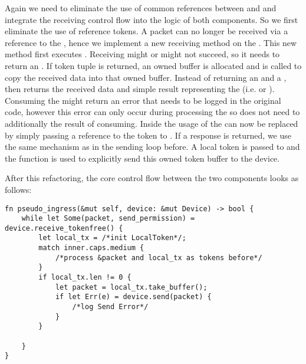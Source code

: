 Again we need to eliminate the use of common references between \stack{} and \dev{} and integrate the receiving control flow into the  logic of both components. So we first eliminate the use of reference tokens. A packet can no longer be received via a reference to the \dev{}, hence we implement a new receiving method on the \dev{}. This new method  first executes . Receiving might or might not succeed, so it needs to return an . If token tuple is returned, an owned buffer is allocated and  is called to copy the received data into that owned buffer. Instead of returning an  and a ,  then returns the received data and simple result representing the  (i.e.  or ). Consuming the  might return an error that needs to be logged in the original code, however this error can only occur during processing the \stack{} so  does not need to additionally the result of consuming. 
Inside  the usage of the  can now be replaced by simply passing a reference to the token to . If a response is returned, we use the same mechanism as in the sending loop before. A local token is passed to  and the  function is used to explicitly send this owned token buffer to the device.

After this refactoring, the core control flow between the two components looks as follows:
\begin{verbatim}
fn pseudo_ingress(&mut self, device: &mut Device) -> bool {
    while let Some(packet, send_permission) = device.receive_tokenfree() {
        let local_tx = /*init LocalToken*/;
        match inner.caps.medium {
            /*process &packet and local_tx as tokens before*/
        }
        if local_tx.len != 0 {
            let packet = local_tx.take_buffer();
            if let Err(e) = device.send(packet) {
                /*log Send Error*/
            }
        }
        
    }
}
\end{verbatim}

